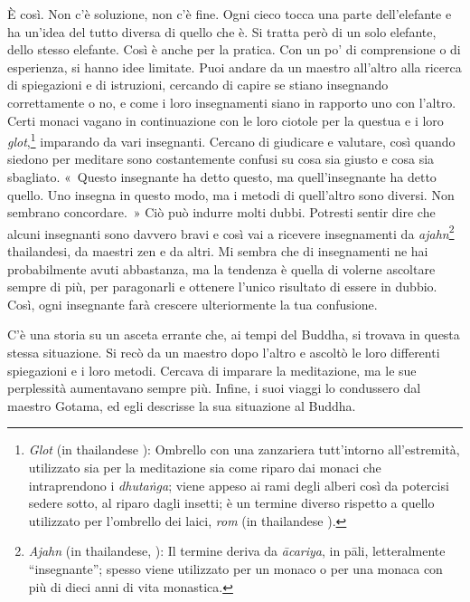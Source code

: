 È così. Non c'è soluzione, non c'è fine. Ogni cieco tocca una parte
dell'elefante e ha un'idea del tutto diversa di quello che è. Si tratta
però di un solo elefante, dello stesso elefante. Così è anche per la
pratica. Con un po' di comprensione o di esperienza, si hanno idee
limitate. Puoi andare da un maestro all'altro alla ricerca di
spiegazioni e di istruzioni, cercando di capire se stiano insegnando
correttamente o no, e come i loro insegnamenti siano in rapporto uno con
l'altro. Certi monaci vagano in continuazione con le loro ciotole per la
questua e i loro \emph{glot},\footnote{\emph{Glot} (in thailandese ):
  Ombrello con una zanzariera tutt'intorno all'estremità, utilizzato sia
  per la meditazione sia come riparo dai monaci che intraprendono i
  \emph{dhutaṅga}; viene appeso ai rami degli alberi così da potercisi
  sedere sotto, al riparo dagli insetti; è un termine diverso rispetto a
  quello utilizzato per l'ombrello dei laici, \emph{rom} (in thailandese
  ).} imparando da vari insegnanti. Cercano di giudicare e valutare,
così quando siedono per meditare sono costantemente confusi su cosa sia
giusto e cosa sia sbagliato. «~Questo insegnante ha detto questo, ma
quell'insegnante ha detto quello. Uno insegna in questo modo, ma i
metodi di quell'altro sono diversi. Non sembrano concordare.~» Ciò può
indurre molti dubbi. Potresti sentir dire che alcuni insegnanti sono
davvero bravi e così vai a ricevere insegnamenti da
\emph{ajahn}\footnote{\emph{Ajahn} (in thailandese, ):
  Il termine deriva da \emph{ācariya}, in pāli, letteralmente
  ``insegnante''; spesso viene utilizzato per un monaco o per una monaca
  con più di dieci anni di vita monastica.} thailandesi, da maestri zen
e da altri. Mi sembra che di insegnamenti ne hai probabilmente avuti
abbastanza, ma la tendenza è quella di volerne ascoltare sempre di più,
per paragonarli e ottenere l'unico risultato di essere in dubbio. Così,
ogni insegnante farà crescere ulteriormente la tua confusione.

C'è una storia su un asceta errante che, ai tempi del Buddha, si trovava
in questa stessa situazione. Si recò da un maestro dopo l'altro e
ascoltò le loro differenti spiegazioni e i loro metodi. Cercava di
imparare la meditazione, ma le sue perplessità aumentavano sempre più.
Infine, i suoi viaggi lo condussero dal maestro Gotama, ed egli
descrisse la sua situazione al Buddha.

